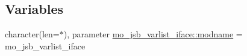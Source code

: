 \subsection*{Variables}
\begin{DoxyCompactItemize}
\item 
character(len=$\ast$), parameter \hyperlink{namespacemo__jsb__varlist__iface_a5a17e1c8f252488a0b648044116fcac7}{mo\+\_\+jsb\+\_\+varlist\+\_\+iface\+::modname} = \textquotesingle{}mo\+\_\+jsb\+\_\+varlist\+\_\+iface\textquotesingle{}
\end{DoxyCompactItemize}
